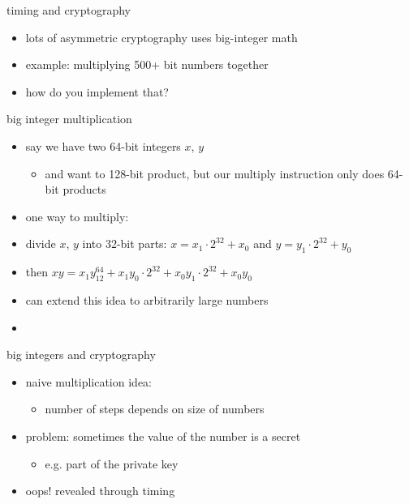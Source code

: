\usetikzlibrary{calc}

\begin{frame}{timing and cryptography}
    \begin{itemize}
    \item lots of asymmetric cryptography uses big-integer math
    \item example: multiplying 500+ bit numbers together
    \vspace{.5cm}
    \item how do you implement that?
    \end{itemize}
\end{frame}

\begin{frame}{big integer multiplication}
    \begin{itemize}
    \item say we have two 64-bit integers $x$, $y$
        \begin{itemize}
        \item and want to 128-bit product, but our multiply instruction only does 64-bit products
        \end{itemize}
    \item one way to multiply:
    \vspace{.5cm}
    \item divide $x$, $y$ into 32-bit parts: $x=x_1\cdot2^{32}+x_0$ and $y=y_1\cdot2^{32}+y_0$
    \item then $xy = x_1y_12^{64}+x_1y_0\cdot2^{32}+x_0y_1\cdot2^{32}+x_0y_0$
    \vspace{.5cm}
    \item<2-> can extend this idea to arbitrarily large numbers
    \item<2-> 
    \end{itemize}
\end{frame}

\begin{frame}{big integers and cryptography}
    \begin{itemize}
    \item naive multiplication idea:
        \begin{itemize}
        \item number of steps depends on size of numbers
        \end{itemize}
    \item problem: sometimes the value of the number is a secret
        \begin{itemize}
        \item e.g. part of the private key
        \end{itemize}
    \item oops! revealed through timing
    \end{itemize}
\end{frame}

